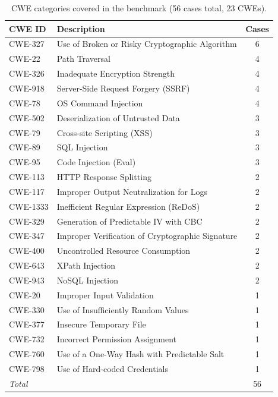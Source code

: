 \documentclass[12pt]{article}
\begin{document}
\begin{table}[H]
  \centering
  \caption{CWE categories covered in the benchmark (56 cases total, 23 CWEs).}
  \label{tab:cwes}
  \small
  \begin{tabular}{llc}
    \toprule
    CWE ID & Description & Cases \\
    \midrule
    CWE-327  & Use of Broken or Risky Cryptographic Algorithm  & 6 \\
    CWE-22   & Path Traversal                                  & 4 \\
    CWE-326  & Inadequate Encryption Strength                  & 4 \\
    CWE-918  & Server-Side Request Forgery (SSRF)              & 4 \\
    CWE-78   & OS Command Injection                            & 4 \\
    CWE-502  & Deserialization of Untrusted Data               & 3 \\
    CWE-79   & Cross-site Scripting (XSS)                      & 3 \\
    CWE-89   & SQL Injection                                   & 3 \\
    CWE-95   & Code Injection (Eval)                           & 3 \\
    CWE-113  & HTTP Response Splitting                         & 2 \\
    CWE-117  & Improper Output Neutralization for Logs         & 2 \\
    CWE-1333 & Inefficient Regular Expression (ReDoS)          & 2 \\
    CWE-329  & Generation of Predictable IV with CBC           & 2 \\
    CWE-347  & Improper Verification of Cryptographic Signature& 2 \\
    CWE-400  & Uncontrolled Resource Consumption               & 2 \\
    CWE-643  & XPath Injection                                 & 2 \\
    CWE-943  & NoSQL Injection                                 & 2 \\
    CWE-20   & Improper Input Validation                       & 1 \\
    CWE-330  & Use of Insufficiently Random Values             & 1 \\
    CWE-377  & Insecure Temporary File                         & 1 \\
    CWE-732  & Incorrect Permission Assignment                 & 1 \\
    CWE-760  & Use of a One-Way Hash with Predictable Salt     & 1 \\
    CWE-798  & Use of Hard-coded Credentials                   & 1 \\
    \midrule
    \multicolumn{2}{l}{\textit{Total}} & 56 \\
    \bottomrule
  \end{tabular}
\end{table}
\end{document}
